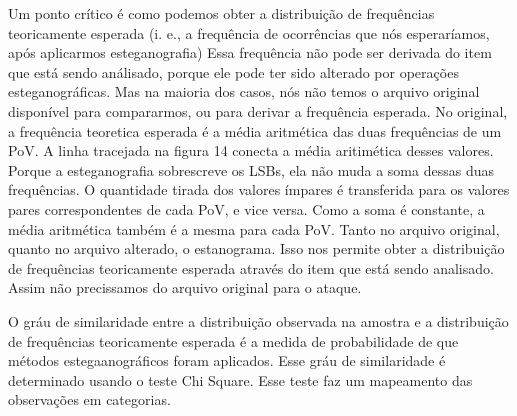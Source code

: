 Um ponto crítico é como podemos obter a distribuição de frequências teoricamente esperada (i. e., a frequência de ocorrências que nós esperaríamos, após aplicarmos esteganografia)
Essa frequência não pode ser derivada do item que está sendo análisado, porque ele pode ter sido alterado por operações esteganográficas.
Mas na maioria dos casos, nós não temos o arquivo original disponível para compararmos, ou para derivar a frequência esperada. No original, a frequência teoretica esperada é a média aritmética das duas frequências de um PoV.
A linha tracejada na figura 14 conecta a média aritimética desses valores. Porque a esteganografia sobrescreve os LSBs, ela não muda a soma dessas duas frequências.
O quantidade tirada dos valores ímpares é transferida para os valores pares correspondentes de cada PoV, e vice versa.
Como a soma é constante, a média aritmética também é a mesma para cada PoV. Tanto no arquivo original, quanto no arquivo alterado, o estanograma.
Isso nos permite obter a distribuição de frequências teoricamente esperada através do item que está sendo analisado. Assim não precissamos do arquivo original para o ataque.


O gráu de similaridade entre a distribuição observada na amostra e a distribuição de frequências teoricamente esperada é a medida de probabilidade de que métodos estegaanográficos foram aplicados.
Esse gráu de similaridade é determinado usando o teste Chi Square. Esse teste faz um mapeamento das observações em categorias.


